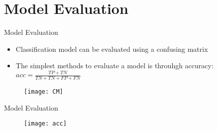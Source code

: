 \documentclass[hyperref={hidelinks}]{beamer}
\begin{document}
  \section{Model Evaluation}
  \begin{frame}{Model Evaluation}
    \begin{itemize}
      \item Classification model can be evaluated using a confusing matrix
      \item The simplest methods to evaluate a model is throuhgh accuracy: $acc = \frac{TP+TN}{TN+TN+FP+FN}$
    \end{itemize}
    \begin{figure}
    \centering
    \texttt{[image: CM]}
    \end{figure}
  \end{frame}

  \begin{frame}{Model Evaluation}
    \begin{figure}
    \centering
    \texttt{[image: acc]}
    \end{figure}
  \end{frame}
\end{document}
